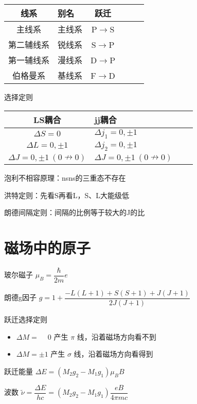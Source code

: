 \documentclass{article}
\begin{document}
\begin{multicols}{2}
\begin{tabular}[H]{@{}|Sl|Sl|Sl|}
  \hline
  线系&别名&跃迁 \\
  \hline
  主线系&主线系&P$\rightarrow$S \\
  \hline
  第二辅线系&锐线系&S$\rightarrow$P \\
  \hline
  第一辅线系&漫线系&D$\rightarrow$P \\
  \hline
  伯格曼系&基线系&F$\rightarrow$D \\
  \hline
\end{tabular}

选择定则

\begin{tabular}[H]{@{}|Sl|Sl|}
  \hline
  LS耦合 & jj耦合 \\
  \hline
  $\Delta S = 0$& $\Delta j_1 = 0, \pm 1$ \\
  \hline
  $\Delta L = 0, \pm 1$ & $\Delta j_2 = 0, \pm 1$ \\
  \hline
  $\Delta J = 0, \pm 1 \ \left( 0 \nrightarrow 0 \right)$ & $\Delta J = 0, \pm 1 \ \left( 0 \nrightarrow 0 \right)$ \\
  \hline
\end{tabular}

泡利不相容原理：nsns的三重态不存在

洪特定则：先看S再看L，S、L大能级低

朗德间隔定则：间隔的比例等于较大的J的比

\section{磁场中的原子}

玻尔磁子 $\mu_B = \dfrac{\hbar}{2m} e $

朗德g因子 $g = 1 + \dfrac{- L \left( L + 1 \right) + S \left( S + 1 \right) + J \left( J + 1 \right)}{2 J \left( J + 1 \right)} $

跃迁选择定则

\begin{itemize}
\item $\Delta M = \phantom{\pm} 0$ 产生 $\pi$ 线，沿着磁场方向看不到
  \item $\Delta M = \pm 1$ 产生 $\sigma$ 线，沿着磁场方向看得到
\end{itemize}

跃迁能量 $\Delta E = \left( M_2 g_2 - M_1 g_1\right) \mu_B B$

波数 $\tilde{\nu} = \dfrac{\Delta E}{hc} = \left( M_2 g_2 - M_1 g_1 \right) \dfrac{eB}{4 \pi m c} $


\end{multicols}
\end{document}
